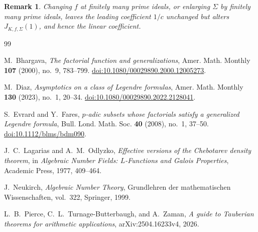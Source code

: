 \documentclass[11pt]{article}
\newtheorem{remark}[theorem]{Remark}
\begin{document}
\begin{remark}
Changing \(f\) at finitely many prime ideals, or enlarging \(\Sigma\)
by finitely many prime ideals, leaves the leading coefficient \(1/c\)
unchanged but alters \(J_{K,f,\Sigma}(1)\), and hence the linear
coefficient.
\end{remark}

\begin{thebibliography}{99}

M.~Bhargava,
\emph{The factorial function and generalizations},
Amer. Math. Monthly \textbf{107} (2000), no.~9, 783--799.
\href{https://doi.org/10.1080/00029890.2000.12005273}
{doi:10.1080/00029890.2000.12005273}.

M.~Diaz,
\emph{Asymptotics on a class of Legendre formulas},
Amer. Math. Monthly \textbf{130} (2023), no.~1, 20--34.
\href{https://doi.org/10.1080/00029890.2022.2128041}
{doi:10.1080/00029890.2022.2128041}.

S.~Evrard and Y.~Fares,
\emph{\(p\)-adic subsets whose factorials satisfy a generalized
Legendre formula},
Bull. Lond. Math. Soc. \textbf{40} (2008), no.~1, 37--50.
\href{https://doi.org/10.1112/blms/bdm090}
{doi:10.1112/blms/bdm090}.

J.~C.~Lagarias and A.~M.~Odlyzko,
\emph{Effective versions of the Chebotarev density theorem},
in \emph{Algebraic Number Fields: \(L\)-Functions and Galois
Properties}, Academic Press, 1977, 409--464.

J.~Neukirch,
\emph{Algebraic Number Theory},
Grundlehren der mathematischen Wissenschaften, vol.~322,
Springer, 1999.

L.~B.~Pierce, C.~L.~Turnage-Butterbaugh, and A.~Zaman,
\emph{A guide to Tauberian theorems for arithmetic applications},
arXiv:2504.16233v4, 2026.

\end{thebibliography}
\end{document}
